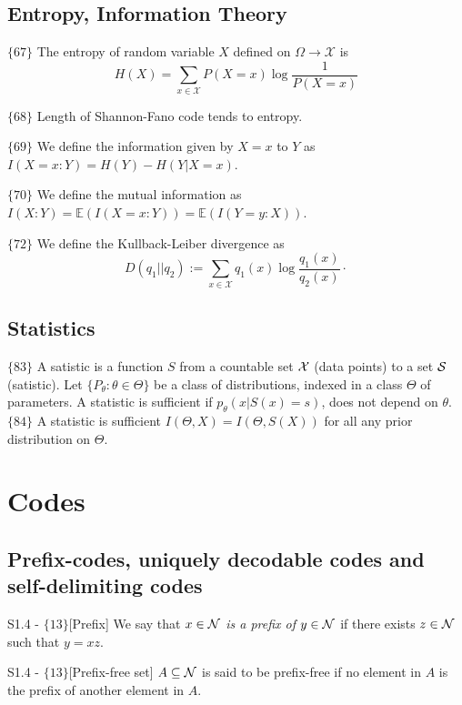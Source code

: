 \documentclass{article}
\begin{document}
\subsection{Entropy, Information Theory}

$\{67\}$ The entropy of random variable $X$ defined on $\Omega \to \mathcal X$ is
\begin{equation}
    H(X) = \sum_{x \in \mathcal X} P(X = x) \log \frac{1}{P(X=x)}
\end{equation}

$\{68\}$ Length of Shannon-Fano code tends to entropy.

$\{69\}$ We define the information given by $X = x$ to $Y$ as $I(X=x: Y) = H(Y) - H(Y|X=x)$.

$\{70\}$ We define the mutual information as $I(X:Y) = \mathbb E(I(X=x:Y)) = \mathbb E(I(Y=y:X))$.

$\{72\}$ We define the Kullback-Leiber divergence as 
\begin{equation}
    D(q_1 || q_2) := \sum_{x\in \mathcal X} q_1(x) \log \frac{q_1(x)}{q_2(x)}\cdot
\end{equation}
\subsection{Statistics}
$\{83\}$ A satistic is a function $S$ from a countable set $\mathcal{X}$ (data points) to a set $\mathcal{S}$ (satistic). Let $\{P_\theta: \theta \in \Theta\}$ be a class of distributions, indexed in a class $\Theta$ of parameters. A statistic is sufficient if $p_\theta(x|S(x) = s)$, does not depend on $\theta$. $\{84\}$ A statistic is sufficient $I(\Theta,X) = I(\Theta,S(X))$ for all any prior distribution on $\Theta$.

\section{Codes}

\subsection{Prefix-codes, uniquely decodable codes and self-delimiting codes}

\begin{flexidefinition}{S1.4 - $\{13\}$}[Prefix]
    We say that \textit{$x \in \mathcal{N}$ is a prefix of $y \in \mathcal{N}$} if there exists $z\in \mathcal{N}$ such that $y = xz$. 
\end{flexidefinition}

\begin{flexidefinition}{S1.4 - $\{13\}$}[Prefix-free set]
    $A \subseteq \mathcal{N}$ is said to be prefix-free if no element in $A$ is the prefix of another element in $A$. 
\end{flexidefinition}
\end{document}
